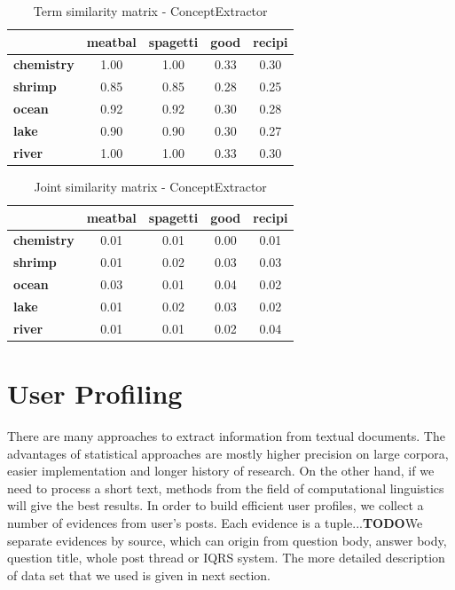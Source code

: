 \documentclass[conference]{IEEEtran}
\newcommand{\TODO}[0]{{\color{BrickRed}\textbf{TODO}}}
\begin{document}
\begin{table}[!t]
\renewcommand{\arraystretch}{1.3}
	\caption{Term similarity matrix - ConceptExtractor}
	\label{tab:termsim}
	\centering
	\begin{tabular}{l||c|c|c|c}\hline
	&\bfseries meatbal & \bfseries spagetti & \bfseries good & \bfseries recipi \\\hline\hline
		\bfseries chemistry & 1.00 & 1.00 & 0.33 & 0.30\\
		\bfseries shrimp & 0.85 & 0.85 & 0.28 & 0.25\\
		\bfseries ocean & 0.92 & 0.92 & 0.30 & 0.28\\
		\bfseries lake & 0.90 & 0.90 & 0.30 & 0.27\\
		\bfseries river & 1.00 & 1.00 & 0.33 & 0.30\\
	\hline
	\end{tabular}
\end{table}

\begin{table}[!t]
\renewcommand{\arraystretch}{1.3}
	\caption{Joint similarity matrix - ConceptExtractor}
	\label{tab:jointsim}
	\centering
	\begin{tabular}{l||c|c|c|c}\hline
	&\bfseries meatbal & \bfseries spagetti & \bfseries good & \bfseries recipi \\\hline\hline
		\bfseries chemistry & 0.01 & 0.01 & 0.00 & 0.01\\
		\bfseries shrimp & 0.01 & 0.02 & 0.03 & 0.03\\
		\bfseries ocean & 0.03 & 0.01 & 0.04 & 0.02\\
		\bfseries lake & 0.01 & 0.02 & 0.03 & 0.02\\
		\bfseries river & 0.01 & 0.01 & 0.02 & 0.04\\
	\hline
	\end{tabular}
\end{table}
	
\section{User Profiling}
\label{sec:userprofiling}
There are many approaches to extract information from textual documents. The advantages of statistical approaches are mostly higher precision on large corpora, easier implementation and longer history of research. On the other hand, if we need to process a short text, methods from the field of computational linguistics will give the best results. In order to build efficient user profiles, we collect a number of evidences from user's posts. Each evidence is a tuple...\TODO We separate evidences by source, which can origin from question body, answer body, question title, whole post thread or IQRS system. The more detailed description of data set that we used is given in next section.  
\end{document}
